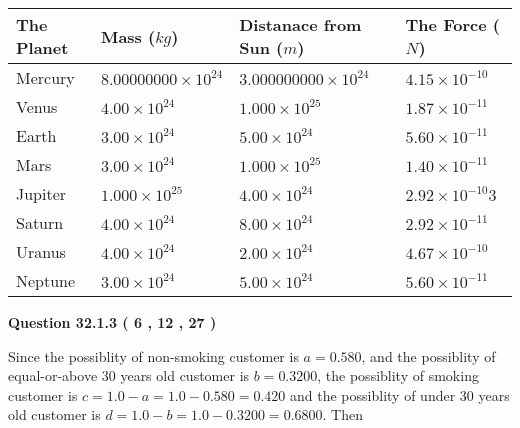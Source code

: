 \documentclass[12pt]{article}
\begin{document}
 
\begin{tabular}{|l|l|l|l|}
\hline
The Planet & Mass ($kg$) & Distanace from Sun ($m$) & The Force ($N$)\\
\hline
Mercury  &
           $ %
8.00000000 \times 10^{24}  $   &
             $ %
3.000000000 \times 10^{24}$    & $ %
4.15 \times 10^{-10} $
\\  \hline
Venus    &
           $  %
4.00 \times 10^{24}  $     &
             $ %
1.000 \times 10^{25} $    & $ %
1.87 \times 10^{-11} $
\\  \hline
Earth    &
           $  %
3.00 \times 10^{24}$     &
             $ %
5.00 \times 10^{24} $    & $ %
5.60 \times 10^{-11} $
\\   \hline
Mars     &
           $  %
3.00 \times 10^{24} $     &
             $ %
1.000 \times 10^{25}$    & $ %
1.40 \times 10^{-11} $
\\   \hline
Jupiter  &
           $  %
1.000 \times 10^{25}  $    &
             $ %
4.00 \times 10^{24} $    & $ %
2.92 \times 10^{-10}3 $
\\  \hline
Saturn   &
           $  %
4.00 \times 10^{24}   $    &
             $ %
8.00 \times 10^{24}  $    & $ %
2.92 \times 10^{-11} $
\\  \hline
Uranus   &
           $  %
4.00 \times 10^{24} $    &
             $ %
2.00 \times 10^{24}$    & $ %
4.67 \times 10^{-10} $
\\  \hline
Neptune  &
           $  %
3.00 \times 10^{24}  $    &
             $ %
5.00 \times 10^{24} $    & $ %
5.60 \times 10^{-11} $
\\  \hline
 
\end{tabular}
 
 
 
 
  
\vspace{0.2in}
  
{\textbf{\Large{Question
32.1.3 
 (           6 ,          12 ,          27 )
}}}
  
  
 
 
\noindent{}

Since the possiblity of  %
 non-smoking customer is $ a =  %
0.580 $,
and the possiblity of  %
equal-or-above 30 years old customer is $ b =  %
0.3200 $,
the possiblity of  %
smoking customer is $ c = 1.0 - a = 1.0 -
0.580
=  %
0.420 $ and the possiblity of  %
under 30 years old
customer is $ d = 1.0 - b = 1.0 -  %
0.3200 =  %
0.6800  $.
Then
 
\end{document}
